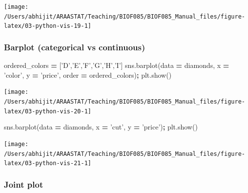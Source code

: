 \documentclass[
  letterpaper,
]{scrbook}
\newenvironment{Shaded}{\begin{snugshade}}{\end{snugshade}}
\newcommand{\NormalTok}[1]{#1}
\newcommand{\OperatorTok}[1]{\textcolor[rgb]{0.81,0.36,0.00}{\textbf{#1}}}
\newcommand{\StringTok}[1]{\textcolor[rgb]{0.31,0.60,0.02}{#1}}
\begin{document}
\begin{center}\texttt{[image: /Users/abhijit/ARAASTAT/Teaching/BIOF085/BIOF085\_Manual\_files/figure-latex/03-python-vis-19-1]} \end{center}

\hypertarget{barplot-categorical-vs-continuous}{%
\subsubsection{Barplot (categorical vs continuous)}\label{barplot-categorical-vs-continuous}}

\begin{Shaded}
\begin{Highlighting}[]
\NormalTok{ordered_colors }\OperatorTok{=}\NormalTok{ [}\StringTok{'D'}\NormalTok{,}\StringTok{'E'}\NormalTok{,}\StringTok{'F'}\NormalTok{,}\StringTok{'G'}\NormalTok{,}\StringTok{'H'}\NormalTok{,}\StringTok{'I'}\NormalTok{]}
\NormalTok{sns.barplot(data }\OperatorTok{=}\NormalTok{ diamonds, x }\OperatorTok{=} \StringTok{'color'}\NormalTok{, y }\OperatorTok{=} \StringTok{'price'}\NormalTok{, order }\OperatorTok{=}\NormalTok{ ordered_colors)}\OperatorTok{;}
\NormalTok{plt.show()}
\end{Highlighting}
\end{Shaded}

\begin{center}\texttt{[image: /Users/abhijit/ARAASTAT/Teaching/BIOF085/BIOF085\_Manual\_files/figure-latex/03-python-vis-20-1]} \end{center}

\begin{Shaded}
\begin{Highlighting}[]
\NormalTok{sns.barplot(data }\OperatorTok{=}\NormalTok{ diamonds, x }\OperatorTok{=} \StringTok{'cut'}\NormalTok{, y }\OperatorTok{=} \StringTok{'price'}\NormalTok{)}\OperatorTok{;}
\NormalTok{plt.show()}
\end{Highlighting}
\end{Shaded}

\begin{center}\texttt{[image: /Users/abhijit/ARAASTAT/Teaching/BIOF085/BIOF085\_Manual\_files/figure-latex/03-python-vis-21-1]} \end{center}

\hypertarget{joint-plot}{%
\subsubsection{Joint plot}\label{joint-plot}}
\end{document}

